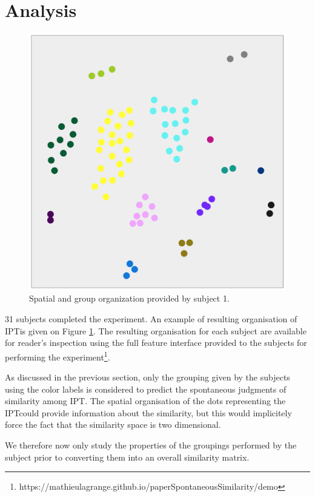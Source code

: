 \documentclass{article}
\newcommand{\ipt}{IPT}
\begin{document}
\section{Analysis}\label{sec:analysis}

\begin{figure}
\center
\includegraphics[width = \textwidth]{figures/xp2example.png}
\caption{Spatial and group organization provided by subject 1.}
\label{fig:xp2display}
\end{figure}

31 subjects completed the experiment. An example of resulting organisation of \ipt is given on Figure \ref{fig:xp2display}.  The resulting organisation for each subject are available for reader's inspection using the full feature interface provided to the subjects for performing the experiment\footnote{https://mathieulagrange.github.io/paperSpontaneousSimilarity/demo}.

As discussed in the previous section, only the grouping given by the subjects using the color labels is considered to predict the spontaneous judgments of similarity among \ipt. The spatial organisation of the dots representing the \ipt could provide information about the similarity, but this would implicitely force the fact that the similarity space is two dimensional.

We therefore now only study the properties of the groupings performed by the subject prior to converting them into an overall similarity matrix.
\end{document}
